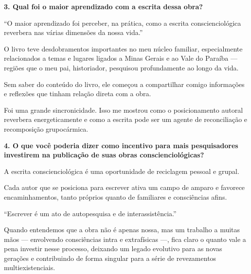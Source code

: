\documentclass{gescons}
\begin{document}
\begin{multicols}{3}
\textbf{3. Qual foi o maior aprendizado com a escrita dessa obra?}

\begin{pullquote}
``O maior aprendizado foi perceber, na prática, como a escrita conscienciológica reverbera nas várias dimensões da nossa vida.''
\end{pullquote}

O livro teve desdobramentos importantes no meu núcleo familiar, especialmente relacionados a temas e lugares ligados a Minas Gerais e ao Vale do Paraíba --- regiões que o meu pai, historiador, pesquisou profundamente ao longo da vida.

Sem saber do conteúdo do livro, ele começou a compartilhar comigo informações e reflexões que tinham relação direta com a obra.

Foi uma grande sincronicidade. Isso me mostrou como o posicionamento autoral reverbera energeticamente e como a escrita pode ser um agente de reconciliação e recomposição grupocármica.

\textbf{4. O que você poderia dizer como incentivo para mais pesquisadores investirem na publicação de suas obras conscienciológicas?}

A escrita conscienciológica é uma oportunidade de reciclagem pessoal e grupal.

Cada autor que se posiciona para escrever ativa um campo de amparo e favorece encaminhamentos, tanto próprios quanto de familiares e consciências afins.

\begin{pullquote}
``Escrever é um ato de autopesquisa e de interassistência.''
\end{pullquote}

Quando entendemos que a obra não é apenas nossa, mas um trabalho a muitas mãos --- envolvendo consciências intra e extrafísicas ---, fica claro o quanto vale a pena investir nesse processo, deixando um legado evolutivo para as novas gerações e contribuindo de forma singular para a série de revezamentos multiexistenciais.

    
    \end{multicols}
\end{document}
